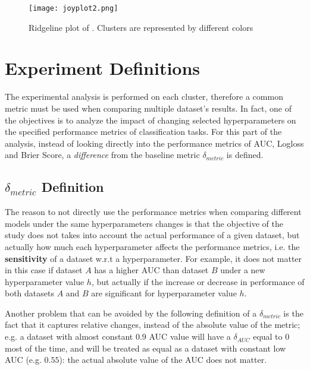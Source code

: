 \begin{figure}[!h]
    \centering
    \texttt{[image: joyplot2.png]}
    \caption{Ridgeline plot of . Clusters are represented by different colors}
    \label{fig:joyplot-2}
\end{figure}


\section{Experiment Definitions}

The experimental analysis is performed on each cluster, therefore a common metric must be used when comparing multiple dataset's results. In fact, one of the objectives is to analyze the impact of changing selected hyperparameters on the specified performance metrics of classification tasks. For this part of the analysis, instead of looking directly into the performance metrics of AUC, Logloss and Brier Score, a \textit{difference} from the baseline metric $\delta_{metric}$ is defined.

\subsection{\texorpdfstring{$\delta_{metric}$}{delta} Definition}
\label{subsec:delta-metrics}

The reason to not directly use the performance metrics when comparing different models under the same hyperparameters changes is that the objective of the study does not takes into account the actual performance of a given dataset, but actually how much each hyperparameter affects the performance metrics, i.e. the \textbf{sensitivity} of a dataset w.r.t a hyperparameter. For example, it does not matter in this case if dataset $A$ has a higher AUC than dataset $B$ under a new hyperparameter value $h$, but actually if the increase or decrease in performance of both datasets $A$ and $B$ are significant for hyperparameter value $h$. 

Another problem that can be avoided by the following definition of a $\delta_{metric}$ is the fact that it captures relative changes, instead of the absolute value of the metric; e.g. a dataset with almost constant $0.9$ AUC value will have a $\delta_{AUC}$ equal to $0$ most of the time, and will be treated as equal as a dataset with constant low AUC (e.g. $0.55$): the actual absolute value of the AUC does not matter.

